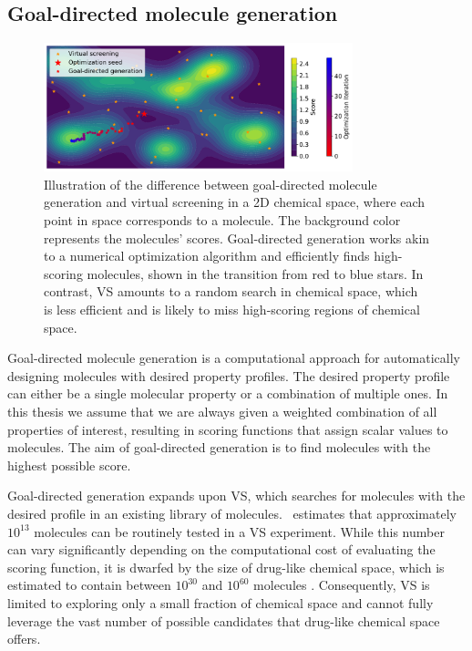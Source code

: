 \subsection{Goal-directed molecule generation}
\begin{figure}
    \centering
    \includegraphics[width=0.8\textwidth]{./figures/goal_directed_generation_vs.pdf}
    \caption{Illustration of the difference between goal-directed molecule generation and virtual
        screening in a 2D chemical space, where each point in space corresponds to a molecule. The
        background color represents the molecules' scores. Goal-directed generation works
        akin to a numerical optimization algorithm and efficiently finds high-scoring molecules,
        shown in the transition from red to blue stars. In contrast, VS amounts to a random search in chemical space, which is less efficient
        and is likely to miss high-scoring regions of chemical space. \label{fig:goal-directed-generation}}
\end{figure}

Goal-directed molecule generation is a computational approach for automatically designing molecules
with desired property profiles. The desired property profile can either be a single molecular
property or a combination of multiple ones. In this thesis we assume that we are always given a
weighted combination of all properties of interest, resulting in scoring functions that assign
scalar values to molecules. The aim of goal-directed generation is to find molecules with the
highest possible score.

Goal-directed generation expands upon \ac{VS}, which searches for molecules with the desired profile
in an existing library of molecules.\ \citet{waltersVirtualChemicalLibraries2019} estimates that approximately
$10^{13}$ molecules can be routinely tested in a \ac{VS} experiment. While this number can vary
significantly depending on the computational cost of evaluating the scoring function, it is dwarfed
by the size of drug-like chemical space, which is estimated to contain between $10^{30}$ and
$10^{60}$ molecules \citep{waltersVirtualChemicalLibraries2019,ruddigkeitEnumeration166Billion2012}.
Consequently, \ac{VS} is limited to exploring only a small fraction of chemical space and cannot
fully leverage the vast number of possible candidates that drug-like chemical space offers.


